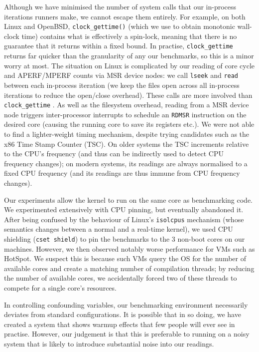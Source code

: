 \documentclass[preprint,numbers,10pt]{sigplanconf}
\begin{document}
Although we have minimised the number of system calls that our in-process
iterations runners make, we cannot escape them entirely. For example,
on both Linux and OpenBSD, \texttt{clock\_gettime()} (which we use to obtain
monotonic wall-clock time) contains what is effectively a spin-lock,
meaning that there is no guarantee that it returns within a fixed bound.
In practise, \texttt{clock\_gettime} returns far quicker than the granularity
of any our benchmarks, so this is a minor worry at most. The situation
on Linux is complicated by our reading of core cycle and APERF/MPERF
counts via MSR device nodes: we call \texttt{lseek} and \texttt{read}
between each in-process iteration (we keep the files open across all
in-process iterations to reduce the open/close overhead).
These calls are more involved than \texttt{clock\_gettime} . As well as the filesystem overhead, reading from a MSR device
node triggers inter-processor interrupts to schedule an \texttt{RDMSR}
instruction on the desired core (causing the running core to save its registers etc.). We
were not able to find a lighter-weight timing mechanism, despite trying
candidates such as the x86 Time Stamp Counter (TSC). On older systems the TSC
increments relative to the CPU's frequency (and thus can be indirectly used to
detect CPU frequency changes); on modern systems, its readings are always
normalised to a fixed CPU frequency (and its readings are thus immune from CPU
frequency changes).

Our experiments allow the kernel to run on the same core as benchmarking code.
We experimented extensively with CPU pinning, but eventually abandoned it. After
being confused by the behaviour of Linux's \texttt{isolcpus} mechanism (whose
semantics changes between a normal and a real-time kernel), we used CPU shielding
(\texttt{cset shield}) to pin the benchmarks to the 3 non-boot cores on our
machines. However, we then observed notably worse performance for VMs such as
HotSpot. We suspect this is because such VMs query the OS for the number of
available cores and create a matching number of compilation threads; by reducing
the number of available cores, we accidentally forced two of these threads to
compete for a single core's resources.

In controlling confounding variables, our benchmarking environment necessarily
deviates from standard configurations. It is possible that in so doing, we have
created a system that shows warmup effects that few people will ever see in
practise. However, our judgement is that this is preferable to running on a
noisy system that is likely to introduce substantial noise into our readings.
\end{document}
